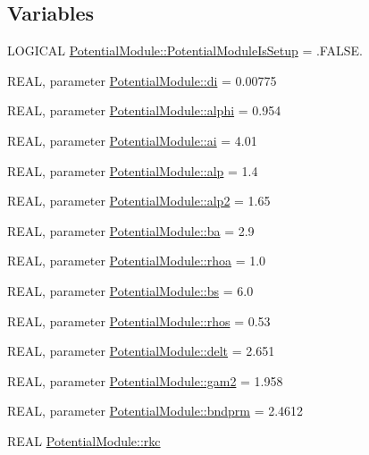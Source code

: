 \subsection*{Variables}
\begin{DoxyCompactItemize}
\item 
LOGICAL \hyperlink{namespace_potential_module_a56b866590823c5b1d9c82b7aa77daf9e}{PotentialModule::PotentialModuleIsSetup} = .FALSE.
\item 
REAL, parameter \hyperlink{namespace_potential_module_a0da530bc0742919bd0e53de92f6e02fa}{PotentialModule::di} = 0.00775
\item 
REAL, parameter \hyperlink{namespace_potential_module_ad9531fa451a7ae33ff2d7c264831bbd3}{PotentialModule::alphi} = 0.954
\item 
REAL, parameter \hyperlink{namespace_potential_module_a5c9cc4bf368687b35bb242530da5756a}{PotentialModule::ai} = 4.01
\item 
REAL, parameter \hyperlink{namespace_potential_module_aa93c85860f19c102f0310f46e0ee9aea}{PotentialModule::alp} = 1.4
\item 
REAL, parameter \hyperlink{namespace_potential_module_af866bbb2550dbe0c5b8f5b17f678ef6b}{PotentialModule::alp2} = 1.65
\item 
REAL, parameter \hyperlink{namespace_potential_module_a199e6aa4930d0d691b3ac82df545fc6a}{PotentialModule::ba} = 2.9
\item 
REAL, parameter \hyperlink{namespace_potential_module_a8fa7bfea18883c3caf65075c95ed1bd2}{PotentialModule::rhoa} = 1.0
\item 
REAL, parameter \hyperlink{namespace_potential_module_ae5ccd9c3015518c7370080c3c74d985f}{PotentialModule::bs} = 6.0
\item 
REAL, parameter \hyperlink{namespace_potential_module_a7585ccecd1db834861fbeb7b4113fd00}{PotentialModule::rhos} = 0.53
\item 
REAL, parameter \hyperlink{namespace_potential_module_a19c3989862133abb6235ae587fe8b229}{PotentialModule::delt} = 2.651
\item 
REAL, parameter \hyperlink{namespace_potential_module_a405bc5381d283c3cd58d018d03e83017}{PotentialModule::gam2} = 1.958
\item 
REAL, parameter \hyperlink{namespace_potential_module_a35408fb0f2283fa2417890b7aef4f054}{PotentialModule::bndprm} = 2.4612
\item 
REAL \hyperlink{namespace_potential_module_a4924d732b6124ef59e9b15aaf63a7160}{PotentialModule::rkc}
\end{DoxyCompactItemize}
